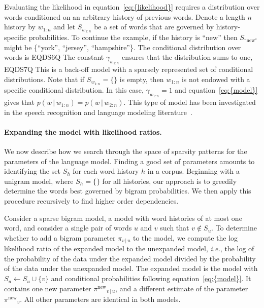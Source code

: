 \documentclass[11pt]{article}
\begin{document}
Evaluating the likelihood in {equation~\eqref{eq:{likelihood}}} requires a distribution
over words conditioned on an arbitrary history of previous words.
Denote a length $n$ history by $w_{1:n}$ and let $S_{w_{1:n}}$ be a
set of words that are governed by history-specific probabilities.  To
continue the example, if the history is ``new'' then
$S_{\textrm{``new"}}$ might be \{``york'', ``jersey'',
``hampshire''\}.  The conditional distribution over words is
EQDS6Q
The constant $\gamma_{w_{1:n}}$ ensures that the distribution sums to
one,
EQDS7Q
This is a back-off model with a sparsely represented set of
conditional distributions.  Note that if $S_{w_{1:n}} = \{\}$ is
empty, then $w_{1:n}$ is not endowed with a specific conditional
distribution.  In this case, $\gamma_{w_{1:n}} = 1$ and {equation~\eqref{eq:{model}}}
gives that $p(w {\,|\,} w_{1:n}) = p(w {\,|\,} w_{2:n})$.  This type of model
has been investigated in the speech recognition and language modeling
literature~\cite{Katz:1987,Seymore:1996,Stolcke:1998}.

\paragraph{Expanding the model with likelihood ratios.}  We now
describe how we search through the space of sparsity patterns for the
parameters of the language model.  Finding a good set of parameters
amounts to identifying the set $S_{h}$ for each word history ${h}$
in a corpus.  Beginning with a unigram model, where $S_{h} = \{\}$
for all histories, our approach is to greedily determine the words
best governed by bigram probabilities.  We then apply this procedure
recursively to find higher order dependencies.

Consider a sparse bigram model, a model with word histories of at most
one word, and consider a single pair of words $u$ and $v$ such that $v
\notin S_u$.  To determine whether to add a bigram parameter $\pi_{v
  {\,|\,} u}$ to the model, we compute the log likelihood ratio of the
expanded model to the unexpanded model, {\textit{i.e.}}, the log of the
probability of the data under the expanded model divided by the
probability of the data under the unexpanded model.  The expanded
model is the model with $S_u \leftarrow S_u \cup \{v\}$ and
conditional probabilities following {equation~\eqref{eq:{model}}}. It contains one new
parameter ${\pi^{\textrm{new}}}_{v {\,|\,} u}$, and a different estimate of the parameter
${\pi^{\textrm{new}}}_v$.  All other parameters are identical in both models.
\end{document}
